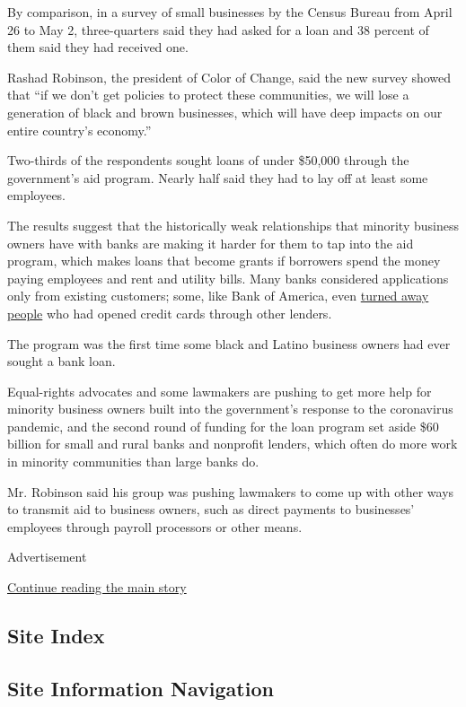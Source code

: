 By comparison, in a survey of small businesses by the Census Bureau from
April 26 to May 2, three-quarters said they had asked for a loan and 38
percent of them said they had received one.

Rashad Robinson, the president of Color of Change, said the new survey
showed that ``if we don't get policies to protect these communities, we
will lose a generation of black and brown businesses, which will have
deep impacts on our entire country's economy.''

Two-thirds of the respondents sought loans of under \$50,000 through the
government's aid program. Nearly half said they had to lay off at least
some employees.

The results suggest that the historically weak relationships that
minority business owners have with banks are making it harder for them
to tap into the aid program, which makes loans that become grants if
borrowers spend the money paying employees and rent and utility bills.
Many banks considered applications only from existing customers; some,
like Bank of America, even
\href{https://www.nytimes.com/2020/04/10/business/minority-business-coronavirus-loans.html}{turned
away people} who had opened credit cards through other lenders.

The program was the first time some black and Latino business owners had
ever sought a bank loan.

Equal-rights advocates and some lawmakers are pushing to get more help
for minority business owners built into the government's response to the
coronavirus pandemic, and the second round of funding for the loan
program set aside \$60 billion for small and rural banks and nonprofit
lenders, which often do more work in minority communities than large
banks do.

Mr. Robinson said his group was pushing lawmakers to come up with other
ways to transmit aid to business owners, such as direct payments to
businesses' employees through payroll processors or other means.

Advertisement

\protect\hyperlink{after-bottom}{Continue reading the main story}

\hypertarget{site-index}{%
\subsection{Site Index}\label{site-index}}

\hypertarget{site-information-navigation}{%
\subsection{Site Information
Navigation}\label{site-information-navigation}}

